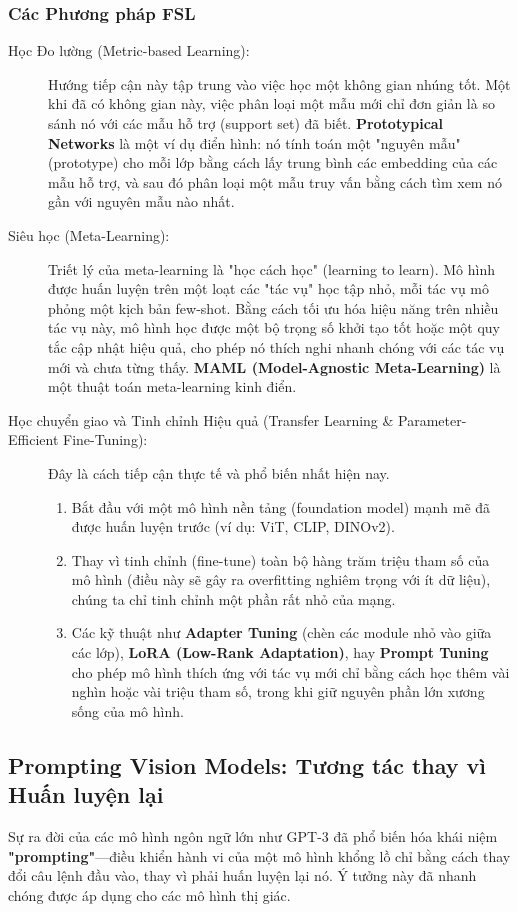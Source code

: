\subsubsection{Các Phương pháp FSL}
\label{subsubsec:fsl_methods}
\begin{description}
	\item[Học Đo lường (Metric-based Learning):] Hướng tiếp cận này tập trung vào việc học một không gian nhúng tốt. Một khi đã có không gian này, việc phân loại một mẫu mới chỉ đơn giản là so sánh nó với các mẫu hỗ trợ (support set) đã biết. \textbf{Prototypical Networks} \cite{Snell2017} là một ví dụ điển hình: nó tính toán một "nguyên mẫu" (prototype) cho mỗi lớp bằng cách lấy trung bình các embedding của các mẫu hỗ trợ, và sau đó phân loại một mẫu truy vấn bằng cách tìm xem nó gần với nguyên mẫu nào nhất.
	\item[Siêu học (Meta-Learning):] Triết lý của meta-learning là "học cách học" (learning to learn). Mô hình được huấn luyện trên một loạt các "tác vụ" học tập nhỏ, mỗi tác vụ mô phỏng một kịch bản few-shot. Bằng cách tối ưu hóa hiệu năng trên nhiều tác vụ này, mô hình học được một bộ trọng số khởi tạo tốt hoặc một quy tắc cập nhật hiệu quả, cho phép nó thích nghi nhanh chóng với các tác vụ mới và chưa từng thấy. \textbf{MAML (Model-Agnostic Meta-Learning)} là một thuật toán meta-learning kinh điển.
	\item[Học chuyển giao và Tinh chỉnh Hiệu quả (Transfer Learning \& Parameter-Efficient Fine-Tuning):] Đây là cách tiếp cận thực tế và phổ biến nhất hiện nay.
	\begin{enumerate}
		\item Bắt đầu với một mô hình nền tảng (foundation model) mạnh mẽ đã được huấn luyện trước (ví dụ: ViT, CLIP, DINOv2).
		\item Thay vì tinh chỉnh (fine-tune) toàn bộ hàng trăm triệu tham số của mô hình (điều này sẽ gây ra overfitting nghiêm trọng với ít dữ liệu), chúng ta chỉ tinh chỉnh một phần rất nhỏ của mạng.
		\item Các kỹ thuật như \textbf{Adapter Tuning} (chèn các module nhỏ vào giữa các lớp), \textbf{LoRA (Low-Rank Adaptation)}, hay \textbf{Prompt Tuning} cho phép mô hình thích ứng với tác vụ mới chỉ bằng cách học thêm vài nghìn hoặc vài triệu tham số, trong khi giữ nguyên phần lớn xương sống của mô hình.
	\end{enumerate}
\end{description}

\subsection{Prompting Vision Models: Tương tác thay vì Huấn luyện lại}
\label{subsec:prompting_vision_models}
Sự ra đời của các mô hình ngôn ngữ lớn như GPT-3 đã phổ biến hóa khái niệm \textbf{"prompting"}—điều khiển hành vi của một mô hình khổng lồ chỉ bằng cách thay đổi câu lệnh đầu vào, thay vì phải huấn luyện lại nó. Ý tưởng này đã nhanh chóng được áp dụng cho các mô hình thị giác.

